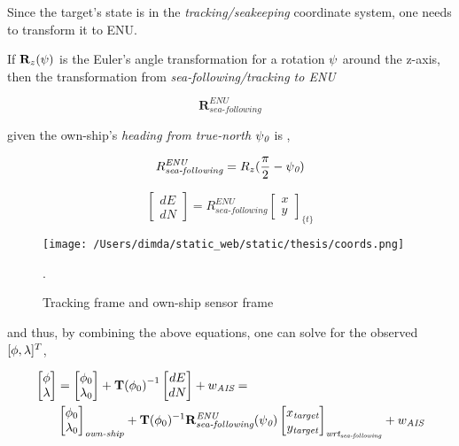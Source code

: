 Since the target's state is in the \emph{tracking/seakeeping} coordinate system, one needs to transform it to ENU.

If $\mathbf{R}_z({\psi})$ is the Euler's angle transformation for a rotation ${\psi}$ around the z-axis, then the transformation from \emph{sea-following/tracking to ENU}

$$\mathbf{R}^{\textit{ENU}}_{\textit{sea-following}} $$

given the own-ship's \emph{heading from true-north} ${\psi}_{\textit{0}}$
is ,


\begin{equation}
R_{\textit{sea-following}}^{\textit{ENU}} = R_{z}(\frac{\pi}{2}-{\psi}_{\textit{0}})
\end{equation}


\begin{equation}
\begin{bmatrix}
dE\\ dN
\end{bmatrix}=
R_{\textit{sea-following}}^{\textit{ENU}}
\begin{bmatrix}
x\\ y
\end{bmatrix}_{\textit{\{t\}}}
\end{equation}


\begin{figure}[H]
	\centering
	\texttt{[image: /Users/dimda/static\_web/static/thesis/coords.png]}
	\caption{Tracking frame and own-ship sensor frame}.
	\label{fig:track_vs_own_ship}
\end{figure}



and thus, by combining the above equations, one can solve for the observed $[{\phi}, {\lambda}]^{T}$,

\begin{equation}
\begin{aligned}
\begin{bmatrix}
{\phi}\\ {\lambda}
\end{bmatrix}&=
\begin{bmatrix}
{\phi}_{0}\\ {\lambda}_{0}
\end{bmatrix} + {\mathbf{T}({\phi}_{0})}^{-1}\begin{bmatrix}
dE\\ dN
\end{bmatrix} + {w}_{\textit{AIS}}=  \\
&\begin{bmatrix}
{\phi}_{0}\\ {\lambda}_{0}
\end{bmatrix}_{\textit{own-ship}} + \mathbf{T}({\phi}_{0})^{-1}
\mathbf{R}^{\textit{ENU}}_{\textit{sea-following}}({\psi}_{\textit{0}})
\begin{bmatrix}
x_{\textit{target}}\\ y_{\textit{target}}
\end{bmatrix}_{\textit{wrt}_{{\textit{sea-following}}}}+{w}_{\textit{AIS}}
\end{aligned}
\end{equation}


